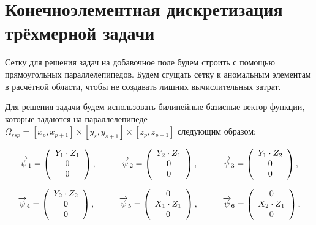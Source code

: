 \section{Конечноэлементная дискретизация трёхмерной задачи}

Сетку для решения задач на добавочное поле будем строить с помощью прямоугольных параллелепипедов. Будем сгущать сетку к аномальным элементам в расчётной области, чтобы не создавать лишних вычислительных затрат. 

Для решения задачи будем использовать билинейные базисные вектор-функции, которые задаются на параллелепипеде $\Omega_{rsp} = [x_p, x_{p+1}] \times [y_s, y_{s+1}] \times [z_p, z_{p+1}]$ следующим образом:

\begin{equation*}
	\overrightarrow{\psi}_1 = \left(
	\begin{array}{c}
		Y_1 \cdot Z_1\\
		0\\
		0\\
	\end{array}
	\right),
	\hspace{10mm}
	\overrightarrow{\psi}_2 = \left(
	\begin{array}{c}
		Y_2 \cdot Z_1\\
		0\\
		0\\
	\end{array}
	\right),
	\hspace{10mm}
	\overrightarrow{\psi}_3 = \left(
	\begin{array}{c}
		Y_1 \cdot Z_2\\
		0\\
		0\\
	\end{array}
	\right),
\end{equation*}

\begin{equation*}
	\overrightarrow{\psi}_4 = \left(
	\begin{array}{c}
		Y_2 \cdot Z_2\\
		0\\
		0\\
	\end{array}
	\right),
	\hspace{10mm}
	\overrightarrow{\psi}_5 = \left(
	\begin{array}{c}
		0\\
		X_1 \cdot Z_1\\
		0\\
	\end{array}
	\right),
	\hspace{10mm}
	\overrightarrow{\psi}_6 = \left(
	\begin{array}{c}
		0\\
		X_2 \cdot Z_1\\
		0\\
	\end{array}
	\right),
\end{equation*}


